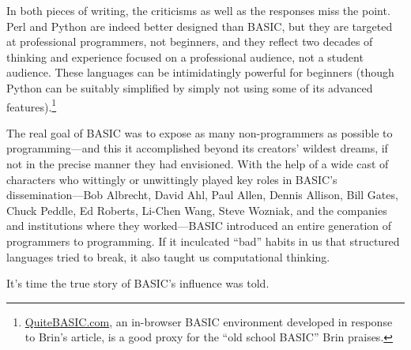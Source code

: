 In both pieces of writing, the criticisms as well as the responses miss
the point.
Perl and Python are indeed better designed than BASIC, but they are
targeted at professional programmers, not beginners, and they reflect
two decades of thinking and experience focused on a professional
audience, not a student audience.
These languages can be intimidatingly powerful for beginners (though
Python can be suitably simplified by simply not using some of its
advanced
features).\footnote{\href{http://quitebasic.com}{QuiteBASIC.com}, an
in-browser BASIC environment developed in response to Brin's article, is
a good proxy for the ``old school BASIC'' Brin praises.}

The real goal of BASIC was to expose as many non-programmers as possible
to programming---and this it accomplished beyond its creators' wildest
dreams, if not in the precise manner they had envisioned.
With the help of a wide cast of characters who wittingly or unwittingly
played key roles in BASIC's dissemination---Bob Albrecht, David Ahl,
Paul Allen, Dennis Allison, Bill Gates, Chuck Peddle, Ed Roberts,
Li-Chen Wang, Steve Wozniak, and the companies and institutions where
they worked---BASIC introduced an entire generation of programmers to
programming.
If it inculcated ``bad'' habits in us that structured languages tried to
break, it also taught us computational thinking.

It's time the true story of BASIC's influence was told.
